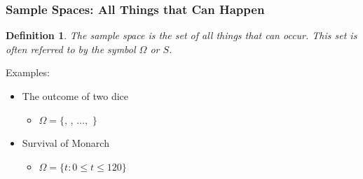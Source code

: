 \documentclass[handout]{beamer}
\def\die#1{{\domino#1}}
\newtheorem{defn}{Definition}
\numberwithin{equation}{section}
\begin{document}
\begin{frame}
\frametitle{Sample Spaces: All Things that Can Happen}

\begin{defn}
The \alert{sample space} is the set of all things that can occur.  This set is often referred to by the symbol $\Omega$ or $S$.
\end{defn}
\pause 
{Examples: } \pause 
\begin{itemize}
\item[1)] The outcome of two dice  \pause
\begin{itemize}
\item[-] $\Omega = \{$\die1\die1, \die1\die2 ,  $\hdots,$ \die6\die6$ \}$ \pause
\end{itemize}
\item[2)] Survival of Monarch \pause
\begin{itemize}
\item[-] $\Omega = \{t: 0\leq t \leq 120\}$ 
\end{itemize}

\end{itemize}
\end{frame}
\end{document}
